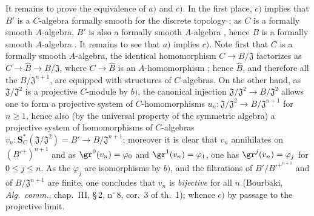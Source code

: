 \begin{env}[19.5.4.4]
\label{0.19.5.4.4}
It remains to prove the equivalence of $a)$ and $c)$.
In the first place, $c)$ implies that $B'$ is a $C$-algebra formally smooth for the discrete topology ;
as $C$ is a formally smooth $A$-algebra, $B'$ is also a formally smooth $A$-algebra , hence $B$ is a formally smooth $A$-algebra .
It remains to see that $a)$ implies $c)$.
Note first that $C$ is a formally smooth $A$-algebra, the identical homomorphism $C\to B/\mathfrak{J}$ factorizes as $C\to\widehat{B}\to B/\mathfrak{J}$, where $C\to\widehat{B}$ is an $A$-homomorphism ;
hence $\widehat{B}$, and therefore all the $B/\mathfrak{J}^{n+1}$, are equipped with structures of $C$-algebras.
On the other hand, as $\mathfrak{J}/\mathfrak{J}^2$ is a projective $C$-module by $b)$, the canonical injection $\mathfrak{J}/\mathfrak{J}^2\to B/\mathfrak{J}^2$ allows one to form a projective system of $C$-homomorphisms $u_n:\mathfrak{J}/\mathfrak{J}^2\to B/\mathfrak{J}^{n+1}$ for $n\geq 1$, hence also (by the universal property of the symmetric algebra) a projective system of homomorphisms of $C$-algebras $v_n:\mathbf{S}_C^*(\mathfrak{J}/\mathfrak{J}^2)=B'\to B/\mathfrak{J}^{n+1}$;
moreover it is clear that $v_n$ annihilates on $({B'}^+)^{n+1}$ and as $\gr^0(v_n)=\varphi_0$ and $\gr^1(v_n)=\varphi_1$, one has $\gr^j(v_n)=\varphi_j$ for $0\leq j\leq n$.
As the $\varphi_j$ are isomorphisms by $b)$, and the filtrations of $B'/{B'}^{+^{n+1}}$ and of $B/\mathfrak{J}^{n+1}$ are finite, one concludes that $v_n$ is \emph{bijective} for
all $n$ (Bourbaki, \emph{Alg.\ comm.}, chap.~III, \S\,2, n$^\circ$\,8, cor.~3 of th.~1); whence $c)$ by passage to the projective limit.
\end{env}


